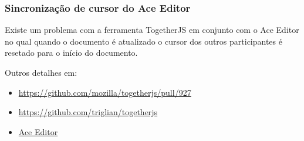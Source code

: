 \subsubsection{Sincronização de cursor do Ace Editor}

Existe um problema com a ferramenta TogetherJS em conjunto com o Ace
Editor no qual quando o documento é atualizado o cursor dos outros
participantes é resetado para o início do documento.

Outros detalhes em:

\begin{itemize}
\item
  \url{https://github.com/mozilla/togetherjs/pull/927}
\item
  \url{https://github.com/triglian/togetherjs}
\item
  \href{http://ace.c9.io/\#nav=about}{Ace Editor}
\end{itemize}
